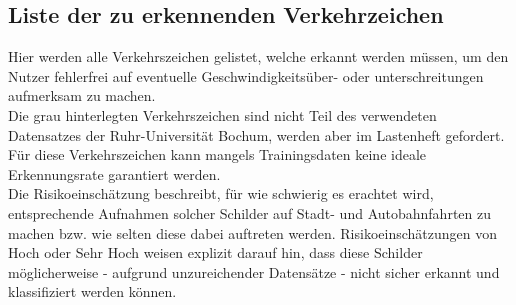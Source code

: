 \begin{appendix}
\pagebreak
\renewcommand{\arraystretch}{1.5}
\section{Liste der zu erkennenden Verkehrzeichen}
\label{sec:liste_zu_erkennende_verkehrszeichen}
Hier werden alle Verkehrszeichen gelistet, welche erkannt werden müssen, um den Nutzer fehlerfrei auf eventuelle Geschwindigkeitsüber- oder unterschreitungen aufmerksam zu machen.\\
Die grau hinterlegten Verkehrszeichen sind nicht Teil des verwendeten Datensatzes der Ruhr-Universität Bochum, werden aber im Lastenheft gefordert. Für diese Verkehrszeichen kann mangels Trainingsdaten keine ideale Erkennungsrate garantiert werden.\\
Die Risikoeinschätzung beschreibt, für wie schwierig es erachtet wird, entsprechende Aufnahmen solcher Schilder auf Stadt- und Autobahnfahrten zu machen bzw. wie selten diese dabei auftreten werden. Risikoeinschätzungen von \glqq{}Hoch\grqq{} oder \glqq{}Sehr Hoch\grqq{} weisen explizit darauf hin, dass diese Schilder möglicherweise - aufgrund unzureichender Datensätze - nicht sicher erkannt und klassifiziert werden können.\\


\end{appendix}
